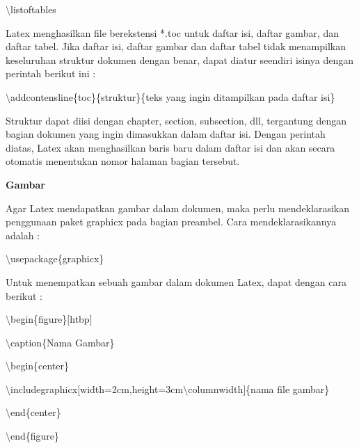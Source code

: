 $\setminus$listoftables
\par \vspace{12pt}
Latex menghasilkan file berekstensi *.toc untuk daftar isi, daftar gambar, dan daftar tabel. Jika daftar isi, daftar gambar dan daftar tabel tidak menampilkan keseluruhan struktur dokumen dengan benar, dapat diatur seendiri isinya dengan perintah berikut ini :\par \vspace{12pt}

$\setminus$addcontensline\{toc\}\{struktur\}\{teks yang ingin 
ditampilkan pada daftar isi\}\par \vspace{12pt}

Struktur dapat diisi dengan chapter, section, subsection, dll, 
tergantung dengan bagian dokumen yang ingin dimasukkan dalam daftar isi. Dengan perintah diatas, Latex akan menghasilkan baris baru dalam daftar isi dan akan secara otomatis menentukan nomor halaman bagian tersebut.\par \vspace{12pt}

\textbf{Gambar}\par \vspace{12pt}

Agar Latex mendapatkan gambar dalam dokumen, maka perlu mendeklarasikan penggunaan paket graphicx pada bagian preambel. Cara mendeklarasikannya adalah :\par \vspace{12pt}

$\setminus$usepackage\{graphicx\}\par \vspace{12pt}

Untuk menempatkan sebuah gambar dalam dokumen Latex, dapat dengan cara berikut :

$\setminus$begin\{figure\}$[$htbp$]$
\par \vspace{12pt}
$\setminus$caption\{Nama Gambar\}
\par \vspace{12pt}
$\setminus$begin\{center\}
\par \vspace{12pt}

$\setminus$includegraphicx$[$width=2cm,height=3cm$\setminus$columnwidth$]$\{nama file gambar\}
\par \vspace{12pt}
$\setminus$end\{center\}
\par \vspace{12pt}
$\setminus$end\{figure\}
\par \vspace{12pt}



